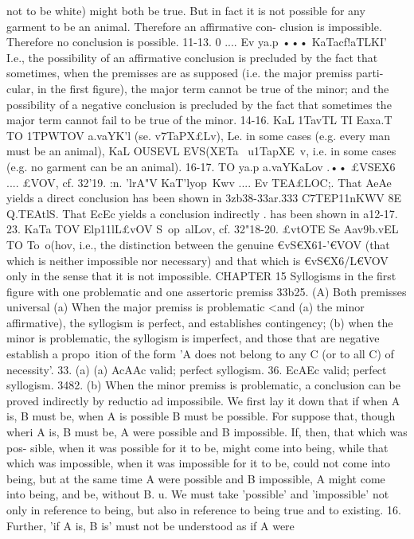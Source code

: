 {{{{{not to be white) might both be true. But in fact it is not possible
for any garment to be an animal. Therefore an affirmative con-
clusion is impossible. Therefore no conclusion is possible.
11-13. 0 .... Ev ya.p ••• KaTacf!aTLKI\!' I.e., the possibility of an
affirmative conclusion is precluded by the fact that sometimes,
when the premisses are as supposed (i.e. the major premiss parti-
cular, in the first figure), the major term cannot be true of the
minor; and the possibility of a negative conclusion is precluded
by the fact that sometimes the major term cannot fail to be true
of the minor.
14-16. KaL 1TavTL TI\! Eaxa.T~ TO 1TPWTOV a.vaYK'l (se. v7TaPX£Lv),
Le. in some cases (e.g. every man must be an animal), KaL OUSEVL
EVS(XETa~ u1TapXE~v, i.e. in some cases (e.g. no garment can be an
animal).
16-17. TO ya.p a.vaYKaLov .•• £VSEX6 .... £VOV, cf. 32'19.
:n. 'lrA"V KaT'lyop~Kwv .... Ev TEA£LOC;. That AeAe yields a direct
conclusion has been shown in 3zb38-33ar.333
C7TEP11nKWV 8E Q.TEAtlS. That EcEc yields a conclusion indirectly
.
has been shown in a12-17.
23. KaTa TOV Elp11lL£vOV S~op~alLov, cf. 32"18-20.
£vtOTE Se Aav9b.vEL TO To~o(hov, i.e., the distinction between the
genuine €vS€X61-'€VOV (that which is neither impossible nor necessary)
and that which is €vS€X6/L€VOV only in the sense that it is not
impossible.
CHAPTER 15
Syllogisms in the first figure with one problematic and one assertoric
premiss
33b25.
(A) Both premisses universal
(a) When the major premiss is problematic <and (a) the minor
affirmative), the syllogism is perfect, and establishes contingency;
(b) when the minor is problematic, the syllogism is imperfect, and
those that are negative establish a propo~ition of the form 'A
does not belong to any C (or to all C) of necessity'.
33. (a) (a) AcAAc valid; perfect syllogism.
36. EcAEc valid; perfect syllogism.
3482. (b) When the minor premiss is problematic, a conclusion
can be proved indirectly by reductio ad impossibile. We first lay
it down that if when A is, B must be, when A is possible B must
be possible. For suppose that, though wheri A is, B must be, A
were possible and B impossible. If, then, that which was pos-
sible, when it was possible for it to be, might come into being,
while that which was impossible, when it was impossible for it to
be, could not come into being, but at the same time A were
possible and B impossible, A might come into being, and be,
without B.
u. We must take 'possible' and 'impossible' not only in
reference to being, but also in reference to being true and to
existing.
16. Further, 'if A is, B is' must not be understood as if A were
}}}}}
